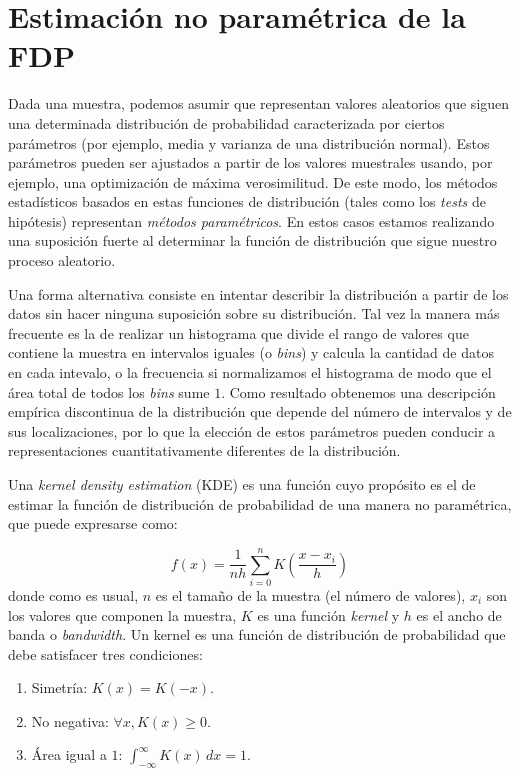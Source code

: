 


\section{Estimación no paramétrica de la FDP}\label{sec:est-kde}

Dada una muestra, podemos asumir que representan valores aleatorios que siguen una determinada distribución de probabilidad caracterizada por ciertos parámetros (por ejemplo, media y varianza de una distribución normal). Estos parámetros pueden ser ajustados a partir de los valores muestrales usando, por ejemplo, una optimización de máxima verosimilitud. De este modo, los métodos estadísticos basados en estas funciones de distribución (tales como los \textit{tests} de hipótesis) representan \textit{métodos paramétricos}. En estos casos estamos realizando una suposición fuerte al determinar la función de distribución que sigue nuestro proceso aleatorio.

Una forma alternativa consiste en intentar describir la distribución a partir de los datos sin hacer ninguna suposición sobre su distribución. Tal vez la manera más frecuente es la de realizar un histograma que divide el rango de valores que contiene la muestra en intervalos iguales (o \textit{bins}) y calcula la cantidad de datos en cada intevalo, o la frecuencia si normalizamos el histograma de modo que el área total de todos los \textit{bins} sume $1$. Como resultado obtenemos una descripción empírica discontinua de la distribución que depende del número de intervalos y de sus localizaciones, por lo que la elección de estos parámetros pueden conducir a representaciones cuantitativamente diferentes de la distribución. 

Una \textit{kernel density estimation} (KDE) es una función cuyo propósito es el de estimar la función de distribución de probabilidad de una manera no paramétrica, que puede expresarse como:

\begin{equation}
 f(x) = \frac{1}{nh} \sum_{i=0}^n K \left( \frac{x - x_i}{h} \right)
\end{equation} 
donde como es usual, $n$ es el tamaño de la muestra (el número de valores), $x_i$ son los valores que componen la muestra, $K$ es una función \textit{kernel} y $h$ es el ancho de banda o \textit{bandwidth}. Un kernel es una función de distribución de probabilidad que debe satisfacer tres condiciones: 
\begin{enumerate}
 \item Simetría: $K(x) = K(-x)$.
 \item No negativa: $\forall x, K(x) \geq 0$.
 \item Área igual a $1$: $\int_{-\infty}^{\infty} K(x) \, dx = 1$.
\end{enumerate}

